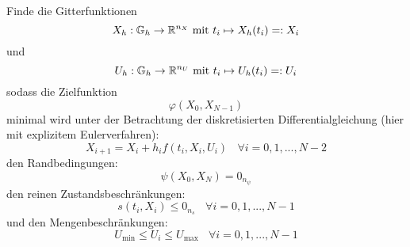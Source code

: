 \begin{problem}\label{prob:VolldisOpt}
    Finde die Gitterfunktionen \[X_h : \mathbb{G}_h \to \mathbb{R}^{n_X} \text{ mit } t_i \mapsto X_h(t_i) =: X_i\] und \[U_h : \mathbb{G}_h \to \mathbb{R}^{n_U} \text{ mit } t_i \mapsto U_h(t_i) =: U_i\] sodass die Zielfunktion \[\varphi(X_0,X_{N-1})\] minimal wird unter der Betrachtung der diskretisierten  Differentialgleichung (hier mit explizitem Eulerverfahren): \[X_{i+1} = X_{i} + h_i f(t_i,X_i,U_i) \ \ \ \ \forall i = 0,1,...,N-2\] den Randbedingungen: \[\psi(X_0,X_N) = 0_{n_{\psi}}\] den reinen Zustandsbeschränkungen: \[s(t_i,X_i) \leq 0_{n_s} \ \ \ \ \forall i = 0,1,...,N-1\] und den Mengenbeschränkungen: \[U_{\min} \leq U_i \leq U_{\max} \ \ \ \ \forall i = 0,1,...,N-1\]
\end{problem}











